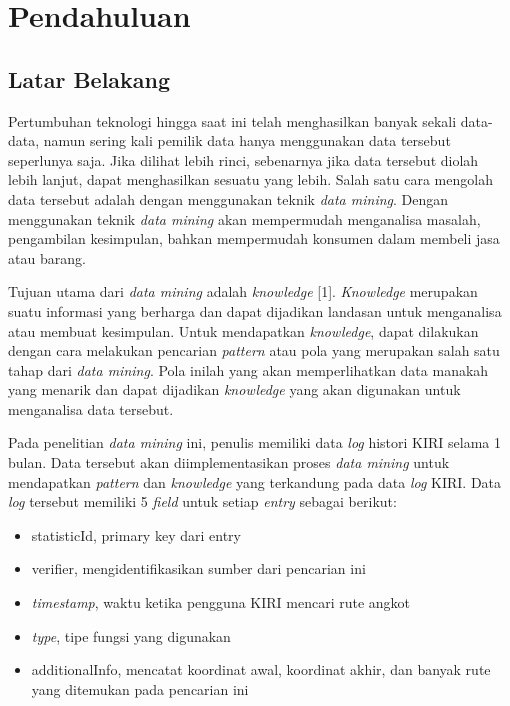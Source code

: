 \chapter{Pendahuluan}
\label{chap:intro}

\section{Latar Belakang}
\label{sec:motivation}

Pertumbuhan teknologi hingga saat ini telah menghasilkan banyak sekali data-data, namun sering kali pemilik data hanya menggunakan data tersebut seperlunya saja. Jika dilihat lebih rinci, sebenarnya jika data tersebut diolah lebih lanjut, dapat menghasilkan sesuatu yang lebih. Salah satu cara mengolah data tersebut adalah dengan menggunakan teknik \textsl{data mining}. Dengan menggunakan teknik \textsl{data mining} akan mempermudah menganalisa masalah, pengambilan kesimpulan, bahkan mempermudah konsumen dalam membeli jasa atau barang.

Tujuan utama dari \textsl{data mining} adalah \textsl{knowledge} [1]. \textsl{Knowledge} merupakan suatu informasi yang berharga dan dapat dijadikan landasan untuk menganalisa atau membuat kesimpulan. Untuk mendapatkan \textsl{knowledge}, dapat dilakukan dengan cara melakukan pencarian \textsl{pattern} atau pola yang merupakan salah satu tahap dari \textsl{data mining}. Pola inilah yang akan memperlihatkan data manakah yang menarik dan dapat dijadikan \textsl{knowledge} yang akan digunakan untuk menganalisa data tersebut.

Pada penelitian \textsl{data mining} ini, penulis memiliki data \textsl{log} histori KIRI selama 1 bulan. Data tersebut akan diimplementasikan proses \textsl{data mining} untuk mendapatkan \textsl{pattern} dan \textsl{knowledge} yang terkandung pada data \textsl{log} KIRI. Data \textsl{log} tersebut memiliki 5 \textsl{field} untuk setiap \textsl{entry} sebagai berikut:
\begin{itemize}
	\item statisticId, primary key dari entry
	\item verifier, mengidentifikasikan sumber dari pencarian ini
	\item \textsl{timestamp}, waktu ketika pengguna KIRI mencari rute angkot
	\item \textsl{type}, tipe fungsi yang digunakan
	\item additionalInfo, mencatat koordinat awal, koordinat akhir, dan banyak rute yang ditemukan pada pencarian ini
\end{itemize}
  
